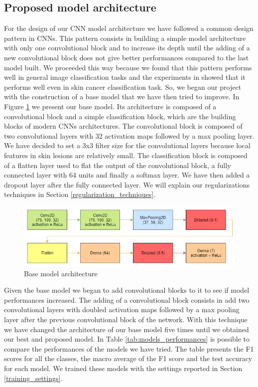 	\subsection{Proposed model architecture}
	
		For the design of our CNN model architecture we have followed a common design pattern in CNNs. This pattern consists in building a simple model architecture with only one convolutional block and to increase its depth until the adding of a new convolutional block does not give better performances compared to the last model built. We proceeded this way because we found that this pattern performs well in general image classification tasks and the experiments in \cite{article3} showed that it performs well even in skin cancer classification task. So, we began our project with the construction of a base model that we have then tried to improve. In Figure \ref{fig:base_model} we present our base model. Its architecture is composed of a convolutional block and a simple classification block, which are the building blocks of modern CNNs architectures. The convolutional block is composed of two convolutional layers with 32 activation maps followed by a max pooling layer. We have decided to set a 3x3 filter size for the convolutional layers because local features in skin lesions are relatively small. The classification block is composed of a flatten layer used to flat the output of the convolutional block, a fully connected layer with 64 units and finally a softmax layer. We have then added a dropout layer after the fully connected layer. We will explain our regularizations techniques in Section \ref{regularization_techniques}. 
		
		\begin{figure}[H]
			\centering
			\includegraphics[width=15cm]{images/base_model.png}
			\caption{Base model architecture}
			\label{fig:base_model}
		\end{figure}
	
		Given the base model we began to add convolutional blocks to it to see if model performances increased. The adding of a convolutional block consists in add two convolutional layers with doubled activation maps followed by a max pooling layer after the previous convolutional block of the network. With this technique we have changed the architecture of our base model five times until we obtained our best and proposed model. In Table \ref{tab:models_performances} is possible to compare the performances of the models we have tried. The table presents the F1 scores for all the classes, the macro average of the F1 score and the test accuracy for each model. We trained these models with the settings reported in Section \ref{training_settings}.
		

